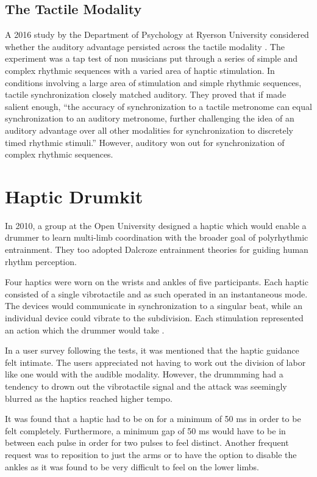 \subsection{The Tactile Modality} \label{tactileModality}
A 2016 study by the Department of Psychology at Ryerson University considered whether the auditory advantage persisted across the tactile modality \cite{ammirante2016synchronizing}. The experiment was a tap test of non musicians put through a series of simple and complex rhythmic sequences with a varied area of haptic stimulation. In conditions involving a large area of stimulation and simple rhythmic sequences, tactile synchronization closely matched auditory. They proved that if made salient enough, “the accuracy of synchronization to a tactile metronome can equal synchronization to an auditory metronome, further challenging the idea of an auditory advantage over all other modalities for synchronization to discretely timed rhythmic stimuli.” However, auditory won out for synchronization of complex rhythmic sequences.

\section{Haptic Drumkit} \label{HD}
In 2010, a group at the Open University designed a haptic which would enable a drummer to learn multi-limb coordination with the broader goal of polyrhythmic entrainment. They too adopted Dalcroze entrainment theories for guiding human rhythm perception. 

Four haptics were worn on the wrists and ankles of five participants. Each haptic consisted of a single vibrotactile and as such operated in an instantaneous mode. The devices would communicate in synchronization to a singular beat, while an individual device could vibrate to the subdivision. Each stimulation represented an action which the drummer would take \cite{holland2010feeling}.

In a user survey following the tests, it was mentioned that the haptic guidance felt intimate. The users appreciated not having to work out the division of labor like one would with the audible modality. However, the drummming had a tendency to drown out the vibrotactile signal and the attack was seemingly blurred as the haptics reached higher tempo. 

It was found that a haptic had to be on for a minimum of 50 ms in order to be felt completely. Furthermore, a minimum gap of 50 ms would have to be in between each pulse in order for two pulses to feel distinct. Another frequent request was to reposition to just the arms or to have the option to disable the ankles as it was found to be very difficult to feel on the lower limbs.

